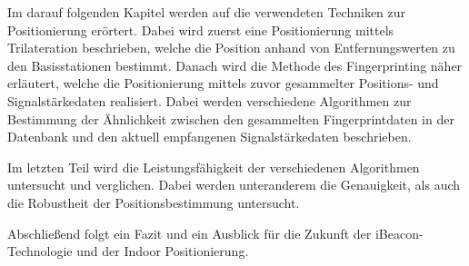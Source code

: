 Im darauf folgenden Kapitel werden auf die verwendeten Techniken zur Positionierung erörtert. Dabei wird zuerst eine Positionierung mittels Trilateration beschrieben, welche die Position anhand von Entfernungswerten zu den Basisstationen bestimmt. Danach wird die Methode des Fingerprinting näher erläutert, welche die Positionierung mittels zuvor gesammelter Positions- und Signalstärkedaten realisiert. Dabei werden verschiedene Algorithmen zur Bestimmung der Ähnlichkeit zwischen den gesammelten Fingerprintdaten in der Datenbank und den aktuell empfangenen Signalstärkedaten beschrieben.

Im letzten Teil wird die Leistungsfähigkeit der verschiedenen Algorithmen untersucht und verglichen. Dabei werden unteranderem die Genauigkeit, als auch die Robustheit der Positionsbestimmung untersucht.

Abschließend folgt ein Fazit und ein Ausblick für die Zukunft der iBeacon-Technologie und der Indoor Positionierung.
